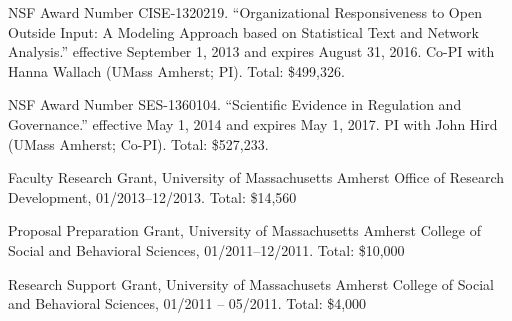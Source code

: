 \documentclass[overlapped,line]{res}
\begin{document}
\begin{resume}
\begin{etaremune}
 \item NSF Award Number CISE-1320219. ``Organizational Responsiveness to Open Outside Input: A Modeling Approach based on Statistical Text and Network Analysis.'' effective September 1, 2013 and expires August 31, 2016.  Co-PI with Hanna Wallach (UMass Amherst; PI). Total: \$499,326.
  \item NSF Award Number SES-1360104. ``Scientific Evidence in Regulation and Governance.'' effective May 1, 2014 and expires May 1, 2017.  PI with John Hird (UMass Amherst; Co-PI). Total: \$527,233.
\item Faculty Research Grant, University of Massachusetts Amherst Office of Research Development, 01/2013--12/2013. Total: \$14,560 
 \item Proposal Preparation Grant, University of Massachusetts Amherst College of Social and Behavioral Sciences, 01/2011--12/2011. Total:  \$10,000
 \item Research Support Grant, University of Massachusets Amherst College of Social and Behavioral Sciences, 01/2011 -- 05/2011. Total: \$4,000
\end{etaremune}


\end{resume}
\end{document}
